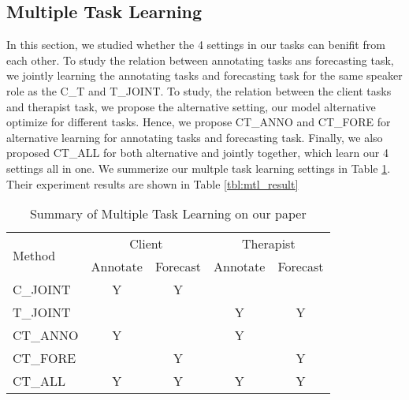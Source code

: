 \subsection{Multiple Task Learning}
\label{ssec:mtl}

In this section, we studied whether the 4 settings in our tasks can benifit from each other.
To study the relation between annotating tasks ans forecasting task, we jointly learning the annotating tasks and forecasting task for the same speaker role as the C\_T and T\_JOINT.  To study, the relation between the client tasks and therapist task, we propose the alternative setting, our model alternative optimize for different tasks. Hence, we propose CT\_ANNO  and CT\_FORE for alternative learning for annotating tasks and forecasting task. Finally, we also proposed CT\_ALL for both alternative and jointly together, which learn our 4 settings all in one. We summerize our multple task learning settings in Table \ref{tbl:mtl}. Their experiment results are shown in Table \ref{tbl:mtl_result}

\begin{table}[tp]
\setlength{\tabcolsep}{3pt}
\begin{center}
\begin{tabular}{l|cc|cc}
\toprule
\multirow{2}{*}{ Method } & \multicolumn{2}{c|}{ Client } & \multicolumn{2}{c}{ Therapist } \\\cmidrule(lr){2-3}  \cmidrule(lr){4-5}
                          & Annotate                      & Forecast & Annotate & Forecast  \\ \midrule \midrule
C\_JOINT                  & Y                             & Y        &          &           \\
T\_JOINT                  &                               &          & Y        & Y         \\\midrule
CT\_ANNO                  & Y                             &          & Y        &           \\
CT\_FORE                  &                               & Y         &         & Y         \\ \midrule
CT\_ALL                   & Y                             & Y        & Y        & Y         \\ \midrule
\bottomrule
\end{tabular}
\end{center}
\caption{\label{tbl:mtl} Summary of Multiple Task Learning on our paper}
\end{table}

